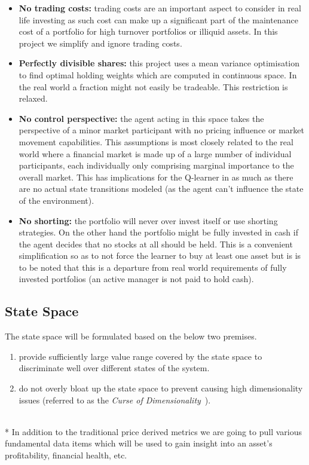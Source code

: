 \documentclass[dvips,12pt]{article}
\begin{document}
\begin{itemize}
\item \textbf{No trading costs:} trading costs are an important aspect to consider in real life investing as such cost can make up a significant part of the maintenance cost of a portfolio for high turnover portfolios or illiquid assets. In this project we simplify and ignore trading costs.
\item \textbf{Perfectly divisible shares:} this project uses a mean variance optimisation to find optimal holding weights which are computed in continuous space. In the real world a fraction might not easily be tradeable. This restriction is relaxed.
\item \textbf{No control perspective:} the agent acting in this space takes the perspective of a minor market participant with no pricing influence or market movement capabilities. This assumptions is most closely related to the real world where a financial market is made up of a large number of individual participants, each individually only comprising marginal importance to the overall market. This has implications for the Q-learner in as much as there are no actual state transitions modeled (as the agent can't influence the state of the environment).
\item \textbf{No shorting:} the portfolio will never over invest itself or use shorting strategies. On the other hand the portfolio might be fully invested in cash if the agent decides that no stocks at all should be held. This is a convenient simplification so as to not force the learner to buy at least one asset but is is to be noted that this is a departure from real world requirements of fully invested portfolios (an active manager is not paid to hold cash).
\end{itemize}

\subsection*{State Space}

The state space will be formulated based on the below two premises.
\begin{enumerate}
	\item provide sufficiently large value range covered by the state space to discriminate well over different states of the system.
	\item do not overly bloat up the state space to prevent causing high dimensionality issues (referred to as the \emph{Curse of Dimensionality}~\cite{rojas2015}).
\end{enumerate}
~\\*
In addition to the traditional price derived metrics we are going to pull various fundamental data items which will be used to gain insight into an asset's profitability, financial health, etc.
\end{document}
